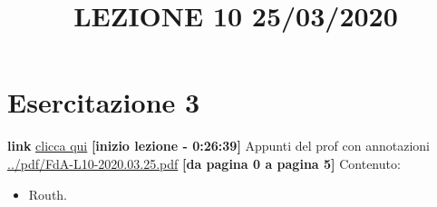\section{Esercitazione 3}
\title{LEZIONE 10 25/03/2020}\newline
\textbf{link} \href{https://web.microsoftstream.com/video/562a82e0-19cc-4f81-9183-eee77c9c45a4?list=user&userId=faa91214-a6f5-40d7-8875-253fd49b8ce1}{clicca qui} \;\;\textbf{[inizio lezione - 0:26:39]}\newline
\newline
Appunti del prof con annotazioni \url{../pdf/FdA-L10-2020.03.25.pdf} \textbf{[da pagina 0 a pagina 5]}\newline
Contenuto:
\begin{itemize}
    \item Routh.
\end{itemize}